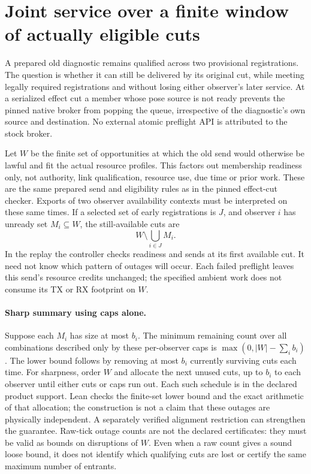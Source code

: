 \documentclass{article}
\begin{document}
\section*{Joint service over a finite window of actually eligible cuts}
A prepared old diagnostic remains qualified across two provisional
registrations. The question is whether it can still be delivered by
its original cut, while meeting legally required registrations and
without losing either observer's later service. At a serialized
effect cut a member whose pose source is not ready prevents the
pinned native broker from popping the queue, irrespective of the
diagnostic's own source and destination. No external atomic
preflight API is attributed to the stock broker.

Let \(W\) be the finite set of opportunities at which the old send
would otherwise be lawful and fit the actual resource profiles.
This factors out membership readiness only, not authority, link
qualification, resource use, due time or prior work. These are the
same prepared send and eligibility rules as in the pinned
effect-cut checker. Exports of two observer availability
contexts must be interpreted on these same times. If a selected
set of early registrations is \(J\), and observer \(i\) has
unready set \(M_i \subseteq W\), the still-available cuts are
\[
             W\setminus\bigcup_{i\in J}M_i.
\]
In the replay the controller checks readiness and sends at its
first available cut. It need not know which pattern of outages will
occur. Each failed preflight leaves this send's resource credits
unchanged; the specified ambient work does not consume its TX or
RX footprint on \(W\).

\paragraph{Sharp summary using caps alone.}
Suppose each \(M_i\) has size at most \(b_i\). The minimum remaining
count over all combinations described only by these per-observer
caps is \(\max(0,|W|-\sum_i b_i)\). The lower bound follows by
removing at most \(b_i\) currently surviving cuts each time.
For sharpness, order \(W\) and allocate the next unused cuts,
up to \(b_i\) to each observer until either cuts or caps run out.
Each such schedule is in the declared product support. Lean
checks the finite-set lower bound and the exact arithmetic of
that allocation; the construction is not a claim that these
outages are physically independent. A separately verified
alignment restriction can strengthen the guarantee. Raw-tick
outage counts are not the declared certificates: they must be valid
as bounds on disruptions of \(W\). Even when a raw count gives a
sound loose bound, it does not identify which qualifying cuts
are lost or certify the same maximum number of entrants.
\end{document}
